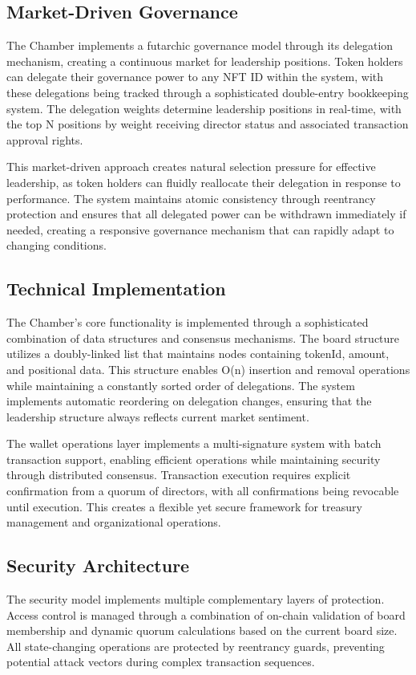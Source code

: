 \documentclass[12pt]{article}
\begin{document}
\subsection{Market-Driven Governance}
The Chamber implements a futarchic governance model through its delegation mechanism, creating a continuous market for leadership positions. Token holders can delegate their governance power to any NFT ID within the system, with these delegations being tracked through a sophisticated double-entry bookkeeping system. The delegation weights determine leadership positions in real-time, with the top N positions by weight receiving director status and associated transaction approval rights.

This market-driven approach creates natural selection pressure for effective leadership, as token holders can fluidly reallocate their delegation in response to performance. The system maintains atomic consistency through reentrancy protection and ensures that all delegated power can be withdrawn immediately if needed, creating a responsive governance mechanism that can rapidly adapt to changing conditions.

\subsection{Technical Implementation}
The Chamber's core functionality is implemented through a sophisticated combination of data structures and consensus mechanisms. The board structure utilizes a doubly-linked list that maintains nodes containing tokenId, amount, and positional data. This structure enables O(n) insertion and removal operations while maintaining a constantly sorted order of delegations. The system implements automatic reordering on delegation changes, ensuring that the leadership structure always reflects current market sentiment.

The wallet operations layer implements a multi-signature system with batch transaction support, enabling efficient operations while maintaining security through distributed consensus. Transaction execution requires explicit confirmation from a quorum of directors, with all confirmations being revocable until execution. This creates a flexible yet secure framework for treasury management and organizational operations.

\subsection{Security Architecture}
The security model implements multiple complementary layers of protection. Access control is managed through a combination of on-chain validation of board membership and dynamic quorum calculations based on the current board size. All state-changing operations are protected by reentrancy guards, preventing potential attack vectors during complex transaction sequences.
\end{document}
